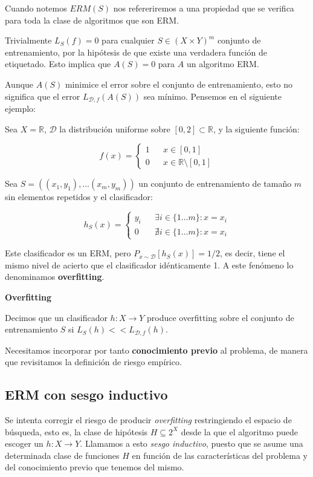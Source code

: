 Cuando notemos $ERM(S)$ nos refereriremos a una propiedad que se verifica para toda la clase de algoritmos que son ERM.

Trivialmente $L_S(f) = 0$ para cualquier $S \in (X \times Y)^m$ conjunto de entrenamiento, por la hipótesis de que existe una
verdadera función de etiquetado. Esto implica que $A(S) = 0$ para $A$ un algoritmo ERM.

Aunque $A(S)$ minimice el error sobre el conjunto de entrenamiento, esto no significa que el error $L_{\mathcal{D},f} (A(S))$ 
sea mínimo. Pensemos en el siguiente ejemplo:

\begin{example}
Sea $X = \mathbb{R}$, $\mathcal{D}$ la distribución uniforme sobre $[0,2]\subset \mathbb{R}$, y la siguiente función:

\[f(x) = \left\{\begin{array}{lcl}
1 && x\in [0,1]\\
0 && x\in \mathbb{R}\setminus [0,1]
\end{array}\right.\]


Sea $S = ((x_1,y_1), \ldots (x_m, y_m))$ un conjunto de entrenamiento de tamaño $m$ sin elementos repetidos y el clasificador:

\[h_S(x) = \left\{\begin{array}{lcl}
y_i && \exists i\in \{1\ldots m\} : x=x_i\\
0 && \nexists i\in \{1\ldots m\} : x=x_i
\end{array}\right.\]

Este clasificador es un ERM, pero $P_{x\sim \mathcal{D}}[h_S(x)] = 1/2$, es decir, tiene el mismo nivel de acierto que el 
clasificador idénticamente 1. A este fenómeno lo denominamos \textbf{overfitting}.
\end{example}

\begin{definition*} \textbf{Overfitting}

 Decimos que un clasificador $h: X\rightarrow Y$ produce overfitting sobre el conjunto de entrenamiento 
 $S$ si $L_S(h) << L_{\mathcal{D},f}(h)$.
\end{definition*}

Necesitamos incorporar por tanto \textbf{conocimiento previo} al problema, de manera que revisitamos la definición de riesgo
empírico.

\subsection{ERM con sesgo inductivo}
Se intenta corregir el riesgo de producir \emph{overfitting} restringiendo el espacio de búsqueda, esto es, la clase de 
hipótesis $H \subseteq 2^X$ desde la que el algoritmo puede escoger un $h: X\rightarrow Y$. Llamamos a esto 
\emph{sesgo inductivo}, puesto que se asume una determinada clase de funciones $H$ en función de las 
características del problema y del conocimiento previo que tenemos del mismo.

